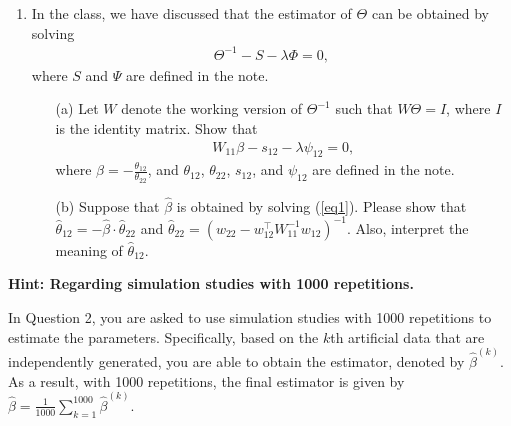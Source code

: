 \documentclass[11pt]{article}
\begin{document}
\begin{enumerate}

\clearpage

\item In the class, we have discussed that the estimator of $\Theta$ can be obtained by solving
\begin{eqnarray*}
\Theta^{-1} - S - \lambda \Phi = 0,
\end{eqnarray*}
where $S$ and $\Psi$ are defined in the note.

\begin{itemize}

\item[(a)] Let $W$ denote the working version of $\Theta^{-1}$ such that $W \Theta = I$, where $I$ is the identity matrix. Show that
\begin{eqnarray} \label{eq1}
W_{11}\beta - s_{12} - \lambda \psi_{12} = 0,
\end{eqnarray}
where $\beta = -\frac{\theta_{12}}{\theta_{22}}$, and $\theta_{12}$, $\theta_{22}$, $s_{12}$, and $\psi_{12}$ are defined in the note.

\item[(b)] Suppose that $\widehat{\beta}$ is obtained by solving (\ref{eq1}). Please show that $\widehat{\theta}_{12} = -\widehat{\beta} \cdot \widehat{\theta}_{22} $ and $\widehat{\theta}_{22} = (w_{22} - w_{12}^\top W_{11}^{-1} w_{12})^{-1}$. Also, interpret the meaning of $\widehat{\theta}_{12}$.

\end{itemize}

\end{enumerate}

\clearpage

{\bf Hint: Regarding simulation studies with 1000 repetitions.}


In Question 2, you are asked to use simulation studies with 1000 repetitions to estimate the parameters. Specifically, based on the $k$th artificial data that are independently generated, you are able to obtain the estimator, denoted by $\widehat{\beta}^{(k)}$. As a result, with 1000 repetitions, the final estimator is given by $\widehat{\beta} = \frac{1}{1000} \sum \limits_{k=1}^{1000} \widehat{\beta}^{(k)}$.
 
\end{document}
